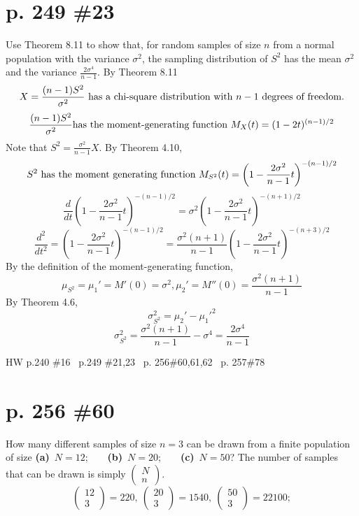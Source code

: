\documentclass[12pt]{article}
\begin{document}
	\section[20pt]{p. 249 \#23}
	Use Theorem 8.11 to show that, for random samples of size \(n\) from a normal population with the variance \(\sigma^2\), the sampling distribution of \(S^2\) has the mean \(\sigma^2\) and the variance \(\frac{2\sigma^4}{n-1}\).
	\newline \newline
	By Theorem 8.11
	\[X=\frac{(n-1)S^2}{\sigma^2} \textup{ has a chi-square distribution with } n-1 \textup{ degrees of freedom.}\]
	\[\frac{(n-1)S^2}{\sigma^2} \textup{has the moment-generating function }M_X(t) = (1-2t)^{(n-1)/2}\]
	Note that \(S^2=\frac{\sigma^2}{n-1}X\). By Theorem 4.10,
	\[S^2 \textup{ has the moment generating function } M_{S^2}(t)=\left(1-\frac{2\sigma^2}{n-1}t\right)^{-(n-1)/2}\]
	\[\frac{d}{dt}\left(1-\frac{2\sigma^2}{n-1}t\right)^{-(n-1)/2}=\sigma^2\left(1-\frac{2\sigma^2}{n-1}t\right)^{-(n+1)/2}\]
	\[\frac{d^2}{dt^2}=\left(1-\frac{2\sigma^2}{n-1}t\right)^{-(n-1)/2}=\frac{\sigma^2(n+1)}{n-1}\left(1-\frac{2\sigma^2}{n-1}t\right)^{-(n+3)/2}\]
	By the definition of the moment-generating function,
	\[\mu_{S^2}=\mu_1'=M'(0)=\sigma^2, \mu_2'=M''(0)=\frac{\sigma^2(n+1)}{n-1}\]
	By Theorem 4.6,
	\[\sigma^2_{S^2}=\mu_2'-{\mu_1'}^2\]
	\[\sigma^2_{S^2}=\frac{\sigma^2(n+1)}{n-1}-\sigma^4=\frac{2\sigma^4}{n-1}\]
	\newpage

	\maketitle HW p.240 \#16 \ p.249 \#21,23 \ p. 256\#60,61,62 \ p. 257\#78
	\section[20pt]{p. 256 \#60}
	How many different samples of size \(n=3\) can be drawn from a finite population of size \newline
	\textbf{(a)}\ \(N=12\);\ \ \ \ \textbf{(b)}\ \(N=20\);\ \ \ \ \textbf{(c)}\ \(N=50\)? \newline \newline
	The number of samples that can be drawn is simply \(\left(\begin{matrix}
	N\\n
	\end{matrix}\right)\).
	\[\left(\begin{matrix}
	12\\3
	\end{matrix}\right)=220,\ \left(\begin{matrix}
	20\\3
	\end{matrix}\right)=1540,\ \left(\begin{matrix}
	50\\3
	\end{matrix}\right)=22100;\]
	\newpage
\end{document}
